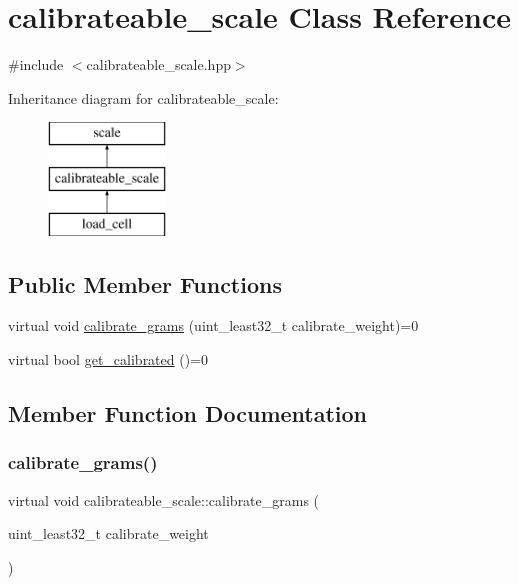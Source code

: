\hypertarget{classcalibrateable__scale}{}\section{calibrateable\+\_\+scale Class Reference}
\label{classcalibrateable__scale}


{\ttfamily \#include $<$calibrateable\+\_\+scale.\+hpp$>$}

Inheritance diagram for calibrateable\+\_\+scale\+:\begin{figure}[H]
\begin{center}
\leavevmode
\includegraphics[height=3.000000cm]{classcalibrateable__scale}
\end{center}
\end{figure}
\subsection*{Public Member Functions}
\begin{DoxyCompactItemize}
\item 
virtual void \hyperlink{classcalibrateable__scale_aee2a0340ba2e1308282565b552e53687}{calibrate\+\_\+grams} (uint\+\_\+least32\+\_\+t calibrate\+\_\+weight)=0
\item 
virtual bool \hyperlink{classcalibrateable__scale_aaa5f41305d1777fffcf7dc63dce065e0}{get\+\_\+calibrated} ()=0
\end{DoxyCompactItemize}


\subsection{Member Function Documentation}
\mbox{\label{classcalibrateable__scale_aee2a0340ba2e1308282565b552e53687}} 
\subsubsection{\texorpdfstring{calibrate\+\_\+grams()}{calibrate\_grams()}}
{\footnotesize\ttfamily virtual void calibrateable\+\_\+scale\+::calibrate\+\_\+grams (\begin{DoxyParamCaption}\item[{uint\+\_\+least32\+\_\+t}]{calibrate\+\_\+weight }\end{DoxyParamCaption})\hspace{0.3cm}{\ttfamily [pure virtual]}}



